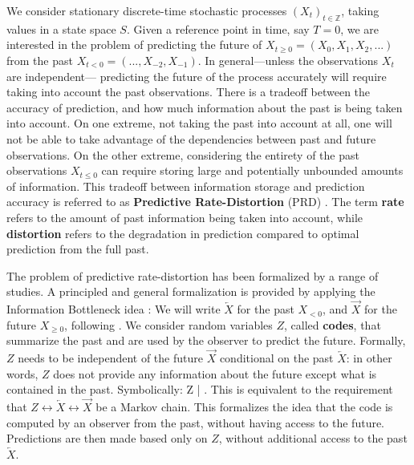 \documentclass[entropy,article,submit,moreauthors,pdftex,10pt,a4paper]{Definitions/mdpi}
\newcommand{\future}{\overrightarrow{X}}
\newcommand{\past}{\overleftarrow{X}}
\newcommand{\key}{\textbf}
\let\oldequation\equation
\let\oldendequation\endequation
\renewenvironment{equation}
  {\linenomathNonumbers\oldequation}
  {\oldendequation\endlinenomath}
\begin{document}
We consider stationary discrete-time stochastic processes $(X_t)_{t \in \mathbb{Z}}$, taking values in a state space $S$.
Given a reference point in time, say $T=0$, we are interested in the problem of predicting the future of $X_{t\geq 0} = (X_0, X_1, X_2, ...)$ from the past $X_{t< 0} = (..., X_{-2}, X_{-1})$.
In general---unless the observations $X_t$ are independent--- predicting the future of the process accurately will require taking into account the past observations.
There is a tradeoff between the accuracy of prediction, and how much information about the past is being taken into account.
On one extreme, not taking the past into account at all, one will not be able to take advantage of the dependencies between past and future observations.
On the other extreme, considering the entirety of the past observations $X_{t \leq 0}$ can require storing large and potentially unbounded amounts of information.
This tradeoff between information storage and prediction accuracy is referred to as \key{Predictive Rate-Distortion} (PRD) \citep{marzen-predictive-2016}.
The term \key{rate} refers to the amount of past information being taken into account, while \key{distortion} refers to the degradation in prediction compared to optimal prediction from the full past.



The problem of predictive rate-distortion has been formalized by a range of studies.
A principled and general formalization is provided by applying the Information Bottleneck idea \citep{tishby-information-1999, still-optimal-2010,marzen-predictive-2016}:
We will write $\past$ for the past $X_{< 0}$, and $\future$ for the future $X_{\geq 0}$, following \cite{marzen-predictive-2016}.
We consider random variables $Z$, called \key{codes}, that summarize the past and are used by the observer to predict the future.
Formally, $Z$ needs to be independent of the future $\future$ conditional on the past $\past$: in other words, $Z$ does not provide any information about the future except what is contained in the past. Symbolically:
\begin{equation}\label{eq:markov}
	Z \bot \future | \past.
\end{equation}
This is equivalent to the requirement that $Z \leftrightarrow \past \leftrightarrow \future$ be a Markov chain.
This formalizes the idea that the code is computed by an observer from the past, without having access to the future.
Predictions are then made based only on $Z$, without additional access to the past $\past$.
\end{document}
